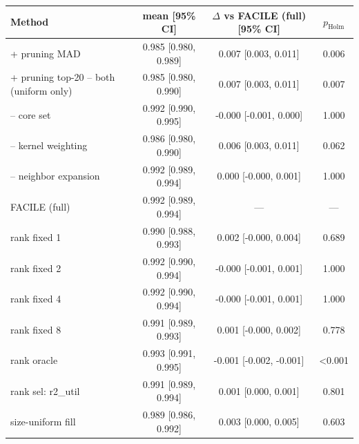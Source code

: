 \begin{tabular}{lccc}
\toprule
Method & mean [95\% CI] & $\Delta$ vs FACILE (full) [95\% CI] & $p_{\mathrm{Holm}}$ \\
\midrule
+ pruning MAD & 0.985 [0.980, 0.989] & 0.007 [0.003, 0.011] & 0.006 \\
+ pruning top-20%
-- both (uniform only) & 0.985 [0.980, 0.990] & 0.007 [0.003, 0.011] & 0.007 \\
-- core set & 0.992 [0.990, 0.995] & -0.000 [-0.001, 0.000] & 1.000 \\
-- kernel weighting & 0.986 [0.980, 0.990] & 0.006 [0.003, 0.011] & 0.062 \\
-- neighbor expansion & 0.992 [0.989, 0.994] & 0.000 [-0.000, 0.001] & 1.000 \\
FACILE (full) & 0.992 [0.989, 0.994] & --- & --- \\
rank fixed 1 & 0.990 [0.988, 0.993] & 0.002 [-0.000, 0.004] & 0.689 \\
rank fixed 2 & 0.992 [0.990, 0.994] & -0.000 [-0.001, 0.001] & 1.000 \\
rank fixed 4 & 0.992 [0.990, 0.994] & -0.000 [-0.001, 0.001] & 1.000 \\
rank fixed 8 & 0.991 [0.989, 0.993] & 0.001 [-0.000, 0.002] & 0.778 \\
rank oracle & 0.993 [0.991, 0.995] & -0.001 [-0.002, -0.001] & <0.001 \\
rank sel: r2_util & 0.991 [0.989, 0.994] & 0.001 [0.000, 0.001] & 0.801 \\
size-uniform fill & 0.989 [0.986, 0.992] & 0.003 [0.000, 0.005] & 0.603 \\
\bottomrule
\end{tabular}

